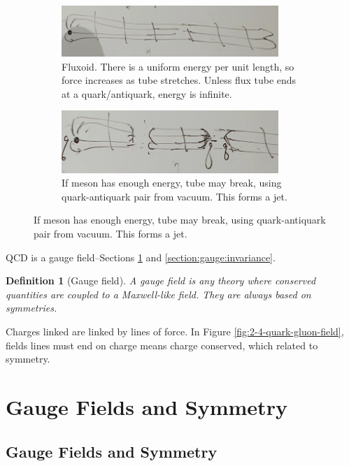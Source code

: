 \documentclass[]{article}
\newtheorem{defn}[thm]{Definition}
\begin{document}
\begin{figure}[H]
\begin{subfigure}[t]{0.45\textwidth}
	\end{subfigure}
	\begin{subfigure}[t]{0.45\textwidth}
		\caption{Fluxoid. There is a uniform energy per unit length, so force increases as tube stretches. Unless flux tube ends at a quark/antiquark, energy is infinite.}
		\includegraphics[width=0.9\textwidth]{2-4-quark-gluon-field-tube-uniform-energy}
	\end{subfigure}
	\begin{subfigure}[t]{0.45\textwidth}
		\caption{If meson has enough energy, tube may break, using quark-antiquark pair from vacuum. This forms a jet.}
		\includegraphics[width=0.9\textwidth]{2-4-split-meson}
	\end{subfigure}
\end{figure}

QCD is a gauge field--Sections \ref{section:gauge:symmetry} and \ref{section:gauge:invariance}.

\begin{defn}[Gauge field]
	A gauge field is any theory where conserved quantities are coupled to a Maxwell-like field. They are always based on symmetries.
\end{defn}

Charges linked are linked by lines of force. In Figure \ref{fig:2-4-quark-gluon-field}, fields lines must end on charge means charge conserved, which related to symmetry.

\section{Gauge Fields and Symmetry}\label{section:gauge:symmetry}

\subsection{Gauge Fields and Symmetry}
\end{document}
